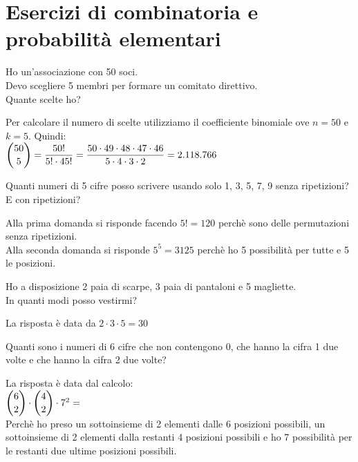\documentclass[12pt]{report}
\newcounter{exercise}
\begin{document}
	\section{Esercizi di combinatoria e probabilità elementari}
	\begin{exercise}{}{}
		\begin{assignment}{}{}
			Ho un'associazione con 50 soci. \\
			Devo scegliere 5 membri per formare un comitato direttivo. \\
			Quante scelte ho?
		\end{assignment}
		Per calcolare il numero di scelte utilizziamo il coefficiente binomiale ove $n = 50$  e $k = 5$. Quindi: \\
		$\mathlarger{\binom{50}{5}} = \dfrac{50!}{5! \cdot 45!} = \dfrac{50 \cdot 49 \cdot 48 \cdot 47 \cdot 46}{5 \cdot 4 \cdot 3 \cdot 2 } = 2.118.766$
	\end{exercise}
	\begin{exercise}{}{}
		\begin{assignment}{}{}
			Quanti numeri di 5 cifre posso scrivere usando solo 1, 3, 5, 7, 9 senza ripetizioni? E con ripetizioni?
		\end{assignment}
		Alla prima domanda si risponde facendo $5! = 120$ perchè sono delle permutazioni senza ripetizioni. \\
		Alla seconda domanda si risponde $5^5 = 3125$ perchè ho 5 possibilità per tutte e 5 le posizioni.
	\end{exercise}
	\begin{exercise}{}{}
		\begin{assignment}{}{}
			Ho a disposizione 2 paia di scarpe, 3 paia di pantaloni e 5 magliette. \\
			In quanti modi posso vestirmi?
		\end{assignment}
		La risposta è data da $2 \cdot 3 \cdot 5 = 30$
	\end{exercise}
	\begin{exercise}{}{}
		\begin{assignment}{}{}
			Quanti sono i numeri di 6 cifre che non contengono 0, che hanno la cifra 1 due volte e che hanno la cifra 2 due volte?
		\end{assignment}
		La risposta è data dal calcolo: \\
		$\mathlarger{\binom{6}{2}} \cdot \mathlarger{\binom{4}{2}} \cdot 7^2 = $ \\
		Perchè ho preso un sottoinsieme di 2 elementi dalle 6 posizioni possibili, un sottoinsieme di 2 elementi dalla restanti 4 posizioni possibili e ho 7 possibilità per le restanti due ultime posizioni possibili.
	\end{exercise}
\end{document}
